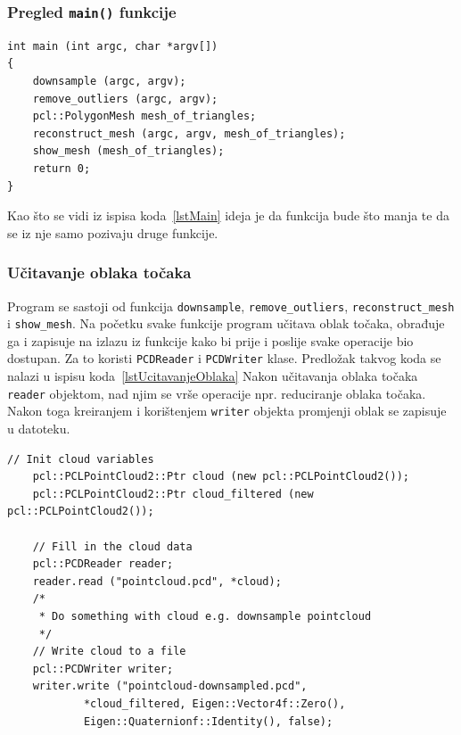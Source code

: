 \newpage
\subsubsection{Pregled \texttt{main()} funkcije} %
\label{ssub:Pregled main funkcije}
\begin{lstlisting}[label=lstMain,caption={Izvorni kod
\texttt{main()} funkcije }]
int main (int argc, char *argv[])
{
    downsample (argc, argv);
    remove_outliers (argc, argv);
    pcl::PolygonMesh mesh_of_triangles;
    reconstruct_mesh (argc, argv, mesh_of_triangles);
    show_mesh (mesh_of_triangles);
    return 0;
}
\end{lstlisting}
Kao što se vidi iz ispisa koda~\ref{lstMain} ideja je da funkcija bude
što manja te da se iz nje samo pozivaju druge funkcije. 


\subsubsection{Učitavanje oblaka točaka} %
\label{ssub:Učitavanje oblaka točaka}
Program se sastoji od funkcija \texttt{downsample},
\texttt{remove\_outliers}, \texttt{reconstruct\_mesh} i
\texttt{show\_mesh}. Na početku svake funkcije program učitava oblak
točaka, obrađuje ga i zapisuje na izlazu iz funkcije kako bi prije i
poslije svake operacije bio dostupan. Za to koristi \texttt{PCDReader} i
\texttt{PCDWriter} klase. Predložak takvog koda se nalazi u ispisu
koda~\ref{lstUcitavanjeOblaka} Nakon učitavanja oblaka točaka
\texttt{reader} objektom, nad njim se vrše operacije npr.  reduciranje
oblaka točaka. Nakon toga kreiranjem i korištenjem \texttt{writer}
objekta promjenji oblak se zapisuje u datoteku.

\begin{lstlisting}[label=lstUcitavanjeOblaka, caption={Predložak izvornog
koda za učitavanje oblaka točaka}]
    // Init cloud variables 
    pcl::PCLPointCloud2::Ptr cloud (new pcl::PCLPointCloud2());
    pcl::PCLPointCloud2::Ptr cloud_filtered (new pcl::PCLPointCloud2());

    // Fill in the cloud data
    pcl::PCDReader reader;
    reader.read ("pointcloud.pcd", *cloud);
    /* 
     * Do something with cloud e.g. downsample pointcloud
     */
    // Write cloud to a file
    pcl::PCDWriter writer;
    writer.write ("pointcloud-downsampled.pcd",
            *cloud_filtered, Eigen::Vector4f::Zero(),
            Eigen::Quaternionf::Identity(), false);
\end{lstlisting}

